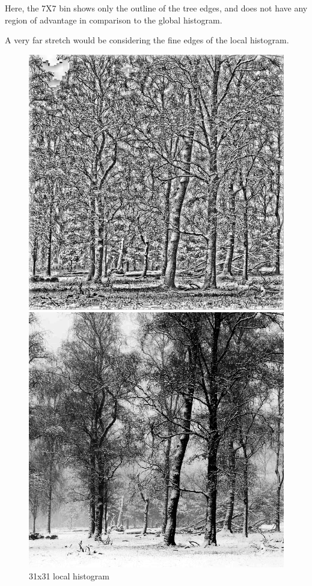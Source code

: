 \documentclass{article}
\begin{document}
Here, the 7X7 bin shows only the outline of the tree edges, and does not have any region of advantage in comparison to the global histogram. 

A very far stretch would be considering the fine edges of the local histogram.

\newpage
\begin{figure}[!htb]
    \centering
    \begin{minipage}[b]{0.45\textwidth}
        \includegraphics[width=\textwidth]{LC2_local_31.jpg}
        \caption{31x31 local histogram}
    \end{minipage}
    \begin{minipage}[b]{0.45\textwidth}
        \includegraphics[width=\textwidth]{LC2_global.png}

\end{minipage}
\end{figure}
\end{document}
